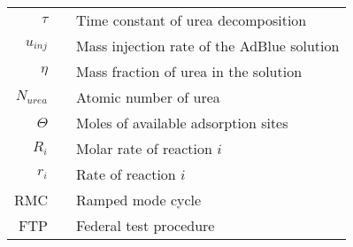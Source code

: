 \begin{table}[H]
\begin{tabular}{r c l}
        $\tau$ & & Time constant of urea decomposition\\
        $u_{inj}$ & & Mass injection rate of the AdBlue solution\\
        $\eta$    & & Mass fraction of urea in the solution\\
        $N_{urea}$ & &Atomic number of urea\\
        $\Theta$ & & Moles of available adsorption sites\\
        $R_i$ & & Molar rate of reaction $i$\\
        $r_i$ & & Rate of reaction $i$\\
        RMC & & Ramped mode cycle\\
        FTP & & Federal test procedure
    \end{tabular}
\end{table}
